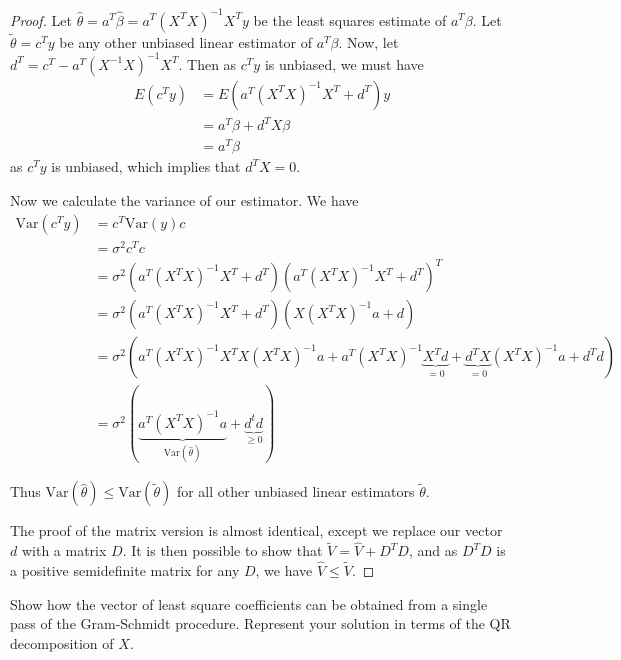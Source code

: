 \begin{proof}
    Let $\hat \theta = a^T \hat \beta = a^T(X^TX)^{-1}X^T y$ be the least squares estimate of $a^T \beta$.  Let $\tilde \theta = c^T y$ be any other unbiased linear estimator of $a^T \beta$.  Now, let $d^T = c^T - a^T(X^{-1}X)^{-1}X^T$.  Then as $c^T y$ is unbiased, we must have \begin{align*}
        E(c^T y) &= E\left( a^T(X^{T}X)^{-1}X^T + d^T\right) y \\
                &= a^T\beta + d^T X\beta \\
                &= a^T\beta
    \end{align*} as $c^T y$ is unbiased, which implies that $d^T X = 0$.

    Now we calculate the variance of our estimator.  We have \begin{align*}
        \text{Var}(c^T y) &= c^T \text{Var}(y) c \\
                    &= \sigma^2 c^T c \\
                    &= \sigma^2 \left( a^T(X^{T}X)^{-1}X^T + d^T \right) \left( a^T (X^T X)^{-1} X^T + d^T \right)^T \\
                    &= \sigma^2 \left( a^T (X^T X)^{-1}X^T + d^T\right) \left(X (X^{T}X)^{-1}a + d\right) \\
                    &= \sigma^2 \left( a^T (X^TX)^{-1}X^T X(X^T X)^{-1} a + a^T (X^T X)^{-1} \underbrace{X^T d}_{=0} + \underbrace{d^T X}_{=0}(X^T X)^{-1} a + d^T d \right) \\
                    &= \sigma^2 \left(\underbrace{a^T (X^T X)^{-1} a}_{\text{Var}(\hat \theta)} + \underbrace{d^t d}_{\geq 0} \right)
    \end{align*}

    Thus $\text{Var}(\hat \theta) \leq \text{Var}(\tilde \theta)$ for all other unbiased linear estimators $\tilde \theta$.

    The proof of the matrix version is almost identical, except we replace our vector $d$ with a matrix $D$.  It is then possible to show that $\tilde V = \hat V + D^T D$, and as $D^T D$ is a positive semidefinite matrix for any $D$, we have $\hat V \leq \tilde V$. 
\end{proof}

\begin{exer}
    Show how the vector of least square coefficients can be obtained from a single pass of the Gram-Schmidt procedure.  Represent your solution in terms of the QR decomposition of $X$.  
\end{exer}

